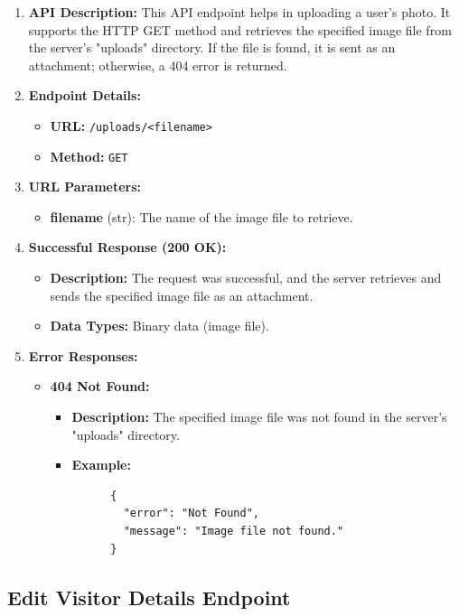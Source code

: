 \documentclass[a4 paper, 12pt]{article}
\begin{document}
\begin{enumerate}
  \item \textbf{API Description:} This API endpoint helps in uploading a user's photo. It supports the HTTP GET method and retrieves the specified image file from the server's "uploads" directory. If the file is found, it is sent as an attachment; otherwise, a 404 error is returned.

  \item \textbf{Endpoint Details:}
  \begin{itemize}
    \item \textbf{URL:} \texttt{/uploads/<filename>}
    \item \textbf{Method:} \texttt{GET}
  \end{itemize}

  \item \textbf{URL Parameters:}
  \begin{itemize}
    \item \textbf{filename} (str): The name of the image file to retrieve.
  \end{itemize}

  \item \textbf{Successful Response (200 OK):}
  \begin{itemize}
    \item \textbf{Description:} The request was successful, and the server retrieves and sends the specified image file as an attachment.
    \item \textbf{Data Types:} Binary data (image file).
  \end{itemize}

  \item \textbf{Error Responses:}
  \begin{itemize}
    \item \textbf{404 Not Found:}
    \begin{itemize}
      \item \textbf{Description:} The specified image file was not found in the server's "uploads" directory.
      \item \textbf{Example:}
      \begin{verbatim}
      {
        "error": "Not Found",
        "message": "Image file not found."
      }
      \end{verbatim}
    \end{itemize}
  \end{itemize}
\end{enumerate}

\subsection{Edit Visitor Details Endpoint}
\end{document}
